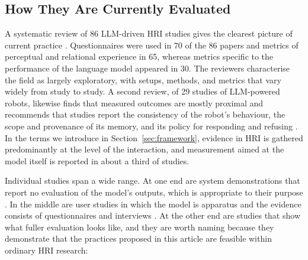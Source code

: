 \subsection{How They Are Currently Evaluated}

A systematic review of 86 LLM-driven HRI studies gives the clearest picture
of current practice \cite{wang2026how}. Questionnaires were used in 70 of
the 86 papers and metrics of perceptual and relational experience in 65,
whereas metrics specific to the performance of the language model appeared
in 30. The reviewers characterise the field as largely exploratory, with
setups, methods, and metrics that vary widely from study to study. A second
review, of 29 studies of LLM-powered robots, likewise finds that measured
outcomes are mostly proximal and recommends that studies report the
consistency of the robot's behaviour, the scope and provenance of its
memory, and its policy for responding and refusing
\cite{nikolova2026systematic}. In the terms we introduce in
Section~\ref{sec:framework}, evidence in HRI is gathered predominantly at
the level of the interaction, and measurement aimed at the model itself is
reported in about a third of studies.

Individual studies span a wide range. At one end are system demonstrations
that report no evaluation of the model's outputs, which is appropriate to
their purpose \cite{billing2023language,cherakara2023furchat}. In the
middle are user studies in which the model is apparatus and the evidence
consists of questionnaires and interviews
\cite{kim2024understanding,rosen2024previous}. At the other end are studies
that show what fuller evaluation looks like, and they are worth naming
because they demonstrate that the practices proposed in this article are
feasible within ordinary HRI research:

